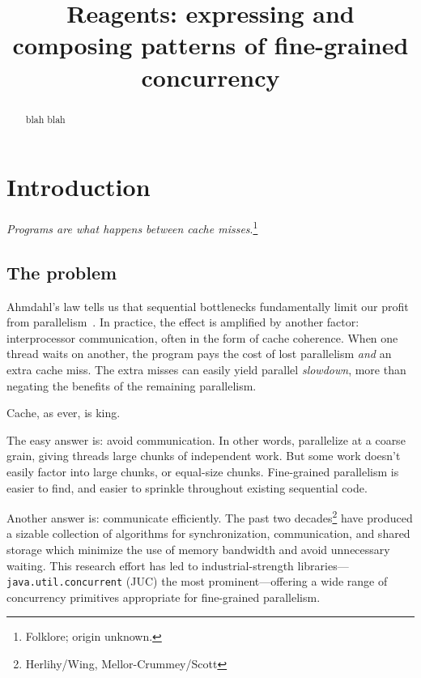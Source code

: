 \documentclass[preprint]{sigplanconf}
\begin{document}
\authorinfo{}{}{}
\title{Reagents: expressing and composing patterns of fine-grained concurrency}
\maketitle

\begin{abstract}
blah blah
\end{abstract}

\section{Introduction}

\emph{Programs are what happens between cache
  misses}.\footnote{Folklore; origin unknown.}

\subsection*{The problem}

Ahmdahl's law tells us that sequential bottlenecks fundamentally limit our
profit from parallelism~\cite{?}.  In practice, the effect is amplified by
another factor: interprocessor communication, often in the form of cache
coherence.  When one thread waits on another, the program pays the cost of
lost parallelism \emph{and} an extra cache miss.  The extra misses can easily
yield parallel \emph{slowdown}, more than negating the benefits of the
remaining parallelism.  

Cache, as ever, is king.

The easy answer is: avoid communication.  In other words, parallelize at a
coarse grain, giving threads large chunks of independent work.  But some work
doesn't easily factor into large chunks, or equal-size chunks.  Fine-grained
parallelism is easier to find, and easier to sprinkle throughout existing
sequential code.

Another answer is: communicate efficiently.  The past two
decades\footnote{Herlihy/Wing, Mellor-Crummey/Scott} have produced a sizable
collection of algorithms for synchronization, communication, and shared
storage which minimize the use of memory bandwidth and avoid unnecessary
waiting.  This research effort has led to industrial-strength
libraries---\texttt{java.util.concurrent} (JUC) the most prominent---offering
a wide range of concurrency primitives appropriate for fine-grained
parallelism.
\end{document}
